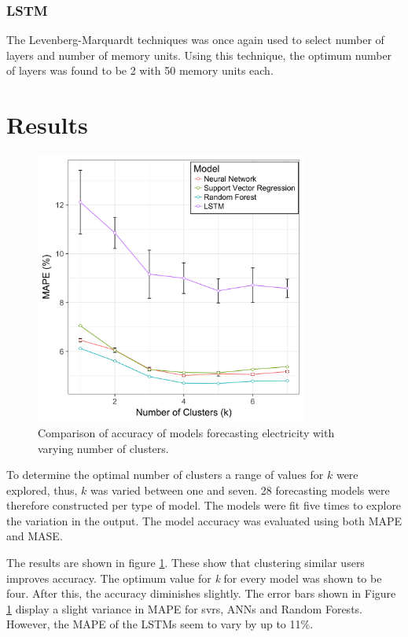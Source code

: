 \subsubsection{LSTM}

The Levenberg-Marquardt techniques was once again used to select number of layers and number of memory units. Using this technique, the optimum number of layers was found to be 2 with 50 memory units each.

\section{Results}
\begin{figure}
	\includegraphics[width=0.8\textwidth]{Chapter5/figures/short-term-forecasting/results.png}
	\caption{Comparison of accuracy of models forecasting electricity with varying number of clusters.}
	\label{fig:results}
\end{figure}
To determine the optimal number of clusters a range of values for $k$ were explored, thus, $k$ was varied between one and seven. 28 forecasting models were therefore constructed per type of model. The models were fit five times to explore the variation in the output. The model accuracy was evaluated using both MAPE and MASE.

The results are shown in figure \ref{fig:results}. These show that clustering similar users improves accuracy. The optimum value for \textit{k} for every model was shown to be four. After this, the accuracy diminishes slightly. The error bars shown in Figure \ref{fig:results} display a slight variance in MAPE for \acrshort{svr}s, ANNs and Random Forests. However, the MAPE of the LSTMs seem to vary by up to 11\%. 

